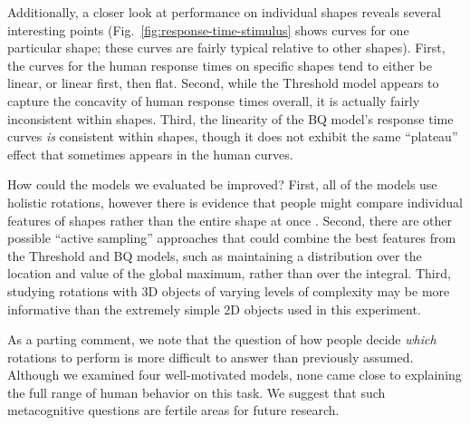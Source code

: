 \documentclass[10pt,letterpaper]{article}
\newcommand{\Th}[0]{Threshold}
\newcommand{\Bq}[0]{BQ}
\begin{document}
Additionally, a closer look at performance on individual shapes
reveals several interesting points
(Fig.~\ref{fig:response-time-stimulus} shows curves for one particular
shape; these curves are fairly typical relative to other
shapes). First, the curves for the human response times on specific
shapes tend to either be linear, or linear first, then flat. Second,
while the \Th{} model appears to capture the concavity of human
response times overall, it is actually fairly inconsistent within
shapes. Third, the linearity of the \Bq{} model's response time curves
\textit{is} consistent within shapes, though it does not exhibit the
same ``plateau'' effect that sometimes appears in the human curves.

How could the models we evaluated be improved? First, all of the
models use holistic rotations, however there is evidence that people
might compare individual features of shapes rather than the entire
shape at once \cite{Just1976,Yuille:1982tx}. Second, there are other
possible ``active sampling'' approaches that could combine the best
features from the \Th{} and \Bq{} models, such as maintaining a
distribution over the location and value of the global maximum, rather
than over the integral. Third, studying rotations with 3D objects of
varying levels of complexity may be more informative than the
extremely simple 2D objects used in this experiment.

As a parting comment, we note that the question of how people decide
\textit{which} rotations to perform is more difficult to answer than
previously assumed. Although we examined four well-motivated models,
none came close to explaining the full range of human behavior on this
task. We suggest that such metacognitive questions are fertile areas
for future research.




\renewcommand{\bibliographytypesize}{\small}
\setlength{\bibleftmargin}{.125in}
\setlength{\bibindent}{-\bibleftmargin}

\end{document}
